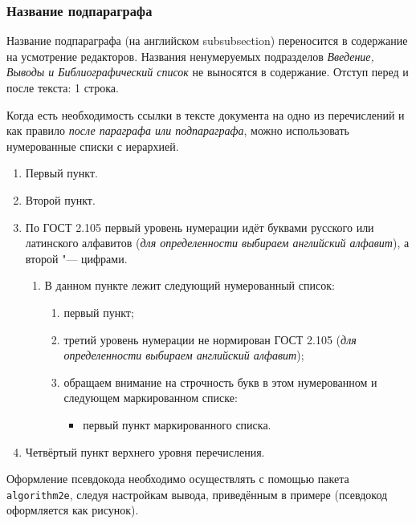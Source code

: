 \begin{refsection}
	
		
	\subsubsection{Название подпараграфа} \label{sect1_3_1_1} %
	
	
	
	
	Название подпараграфа (на английском subsubsection) переносится в содержание на усмотрение редакторов. Названия ненумеруемых подразделов {\itshape Введение, Выводы и Библиографический список} не выносятся в содержание.  Отступ перед и после текста: 1 строка.
	
	Когда есть необходимость ссылки в тексте документа на одно из перечислений и как правило {\itshape после параграфа или подпараграфа}, можно использовать нумерованные списки с иерархией.
	\begin{enumerate}
		\item Первый пункт.
		\item Второй пункт.
		\item По ГОСТ 2.105 первый уровень нумерации идёт буквами русского или латинского алфавитов ({\itshape для определенности выбираем английский алфавит}),
		а второй "--- цифрами. 
		\begin{enumerate}
			\item В данном пункте лежит следующий нумерованный список: 
			\begin{enumerate}
				\item первый пункт;
				\item третий уровень нумерации не нормирован ГОСТ 2.105 ({\itshape для определенности выбираем английский алфавит});
				\item обращаем внимание на строчность букв в этом нумерованном и следующем маркированном списке:
				\begin{itemize}
					\item первый пункт маркированного списка.
				\end{itemize}    
			\end{enumerate}
		\end{enumerate}
		\item Четвёртый пункт верхнего уровня перечисления.
	\end{enumerate}
	
	
	
	Оформление псевдокода необходимо осуществлять с помощью пакета \verb|algorithm2e|, следуя настройкам вывода, приведённым в примере (псевдокод оформляется как рисунок).
	

\end{refsection}
